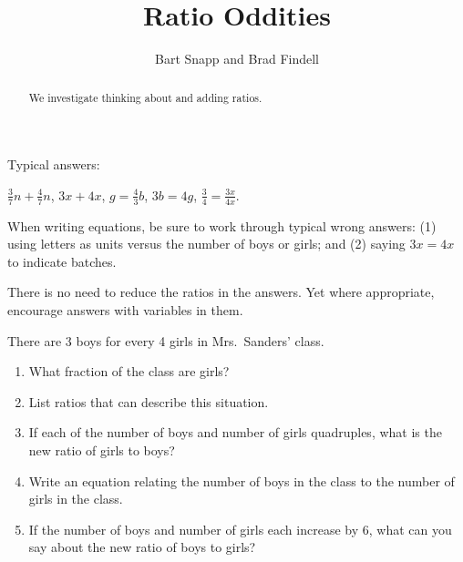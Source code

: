 \documentclass[nooutcomes]{ximera}
\title{Ratio Oddities}
\author{Bart Snapp and Brad Findell}
\begin{document}
\begin{abstract}
We investigate thinking about and adding ratios.
\end{abstract}
\maketitle

\label{A:ratioOddities}


\begin{teachingnote}
Typical answers:
  
\begin{center}
$\frac{3}{7}n+\frac{4}{7}n$, $3x+4x$, $g=\frac{4}{3}b$, $3b=4g$, $\frac{3}{4} = \frac{3x}{4x}$.
\end{center}

When writing equations, be sure to work through typical wrong answers:  (1) using letters as units versus the number of boys or girls; and (2) saying $3x=4x$ to indicate batches.  

There is no need to reduce the ratios in the answers.  Yet where appropriate, encourage answers with variables in them.

\end{teachingnote}

\begin{problem}
There are 3 boys for every 4 girls in Mrs.\ Sanders' class.
\begin{enumerate}
\item What fraction of the class are girls? 
\item List ratios that can describe this situation. 
\item If each of the number of boys and number of girls quadruples, what is the new ratio of girls to boys?
\item Write an equation relating the number of boys in the class to the number of girls in the class.

\item If the number of boys and number of girls each increase by 6, what can you say about the new ratio of boys to girls?
\end{enumerate}
\end{problem}
\end{document}
